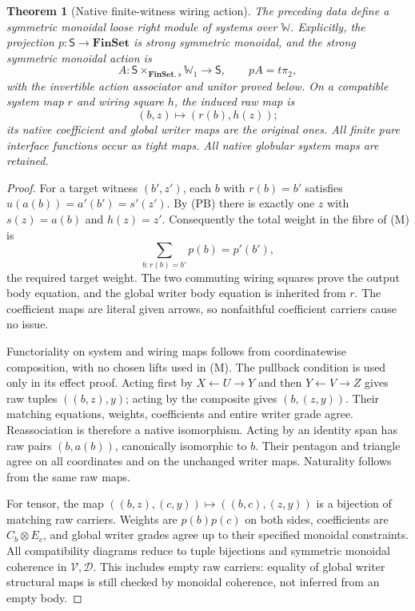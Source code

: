 \documentclass{article}
\newtheorem{theorem}{Theorem}
\newcommand{\Fin}{\mathbf{FinSet}}
\begin{document}
\begin{theorem}[Native finite-witness wiring action]
The preceding data define a symmetric monoidal loose right module of systems over $\mathbb W$. Explicitly, the projection $p:\mathsf S\to\Fin$ is strong symmetric monoidal, and the strong symmetric monoidal action is
\[A:\mathsf S\times_{\Fin,s}\mathbb W_1\longrightarrow\mathsf S,\qquad pA=t\pi_2,\]
with the invertible action associator and unitor proved below. On a compatible system map $r$ and wiring square $h$, the induced raw map is
\[(b,z)\longmapsto(r(b),h(z));\tag{M}\]
its native coefficient and global writer maps are the original ones. All finite pure interface functions occur as tight maps. All native globular system maps are retained.
\end{theorem}
\begin{proof}
For a target witness $(b',z')$, each $b$ with $r(b)=b'$ satisfies $u(a(b))=a'(b')=s'(z')$. By (PB) there is exactly one $z$ with $s(z)=a(b)$ and $h(z)=z'$. Consequently the total weight in the fibre of (M) is
\[\sum_{b:r(b)=b'}p(b)=p'(b'),\]
the required target weight. The two commuting wiring squares prove the output body equation, and the global writer body equation is inherited from $r$. The coefficient maps are literal given arrows, so nonfaithful coefficient carriers cause no issue.

Functoriality on system and wiring maps follows from coordinatewise composition, with no chosen lifts used in (M). The pullback condition is used only in its effect proof. Acting first by $X\leftarrow U\to Y$ and then $Y\leftarrow V\to Z$ gives raw tuples $((b,z),y)$; acting by the composite gives $(b,(z,y))$. Their matching equations, weights, coefficients and entire writer grade agree. Reassociation is therefore a native isomorphism. Acting by an identity span has raw pairs $(b,a(b))$, canonically isomorphic to $b$. Their pentagon and triangle agree on all coordinates and on the unchanged writer maps. Naturality follows from the same raw maps.

For tensor, the map $((b,z),(c,y))\mapsto((b,c),(z,y))$ is a bijection of matching raw carriers. Weights are $p(b)p(c)$ on both sides, coefficients are $C_b\otimes E_c$, and global writer grades agree up to their specified monoidal constraints. All compatibility diagrams reduce to tuple bijections and symmetric monoidal coherence in $\mathcal V,\mathcal D$. This includes empty raw carriers: equality of global writer structural maps is still checked by monoidal coherence, not inferred from an empty body.
\end{proof}
\end{document}
